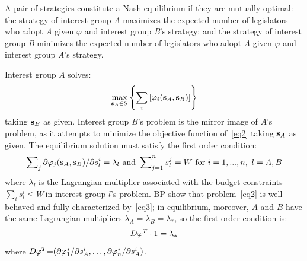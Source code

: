 \documentclass[nojss]{jss}
\begin{document}
A pair of strategies constitute a Nash equilibrium if they are mutually optimal: the strategy of interest group \textit{A} maximizes the expected number of legislators who adopt \textit{A} given $\varphi$ and interest group \textit{B}'s strategy; and the strategy of interest group \textit{B} minimizes the expected number of legislators who adopt \textit{A} given $\varphi$ and interest group \textit{A}'s strategy.

Interest group $A$ solves:
\begin{equation}
	\max_{{\bf s}_{A}\in S}\left\{ \sum_{i}\left[ \varphi _{i}({\bf s}_{A},{\bf s%
	}_{B})\right] \right\}  \label{eq2}
\end{equation}%
taking ${\bf s}_{B}$ as given. Interest group $B$'s problem is the
mirror image of $A$'s problem, as it attempts to minimize the objective
function of~\ref{eq2} taking ${\bf s}_{A}$ as given. The equilibrium
solution must satisfy the first order condition:
\begin{equation}
	\sum\nolimits_{j}\partial \varphi _{j}({\bf s}_{A},{\bf s}_{B})/\partial
	s_{l}^{i}=\lambda _{l}\text{ and }\sum\nolimits_{j=1}^{n}s_{l}^{j}=W\text{
		for }i=1,...,n,\text{ }l=A,B  \label{eq3}
\end{equation}
where $\lambda_{l}$ is the Lagrangian multiplier associated with the budget
constraints $\sum\nolimits_{i}s_{l}^{i}\leq W\,$in interest group $l$'s
problem. BP show that problem~\ref{eq2} is well behaved and fully characterized by~\ref{eq3}; in equilibrium, moreover, $A$ and $B$ have the same Lagrangian multipliers $\lambda_{A}=\lambda _{B}=\lambda _{\ast}$, so the first order condition is: 
\[
D{\bf \varphi }^{T}\cdot 1=\lambda _{\ast } 
\]%
where $D{\bf \varphi }^{T}{\bf =}(\partial \varphi _{1}^{\ast }/\partial
s_{A}^{i},\dots,\partial \varphi _{n}^{\ast }/\partial s_{A}^{i})$.
\end{document}
